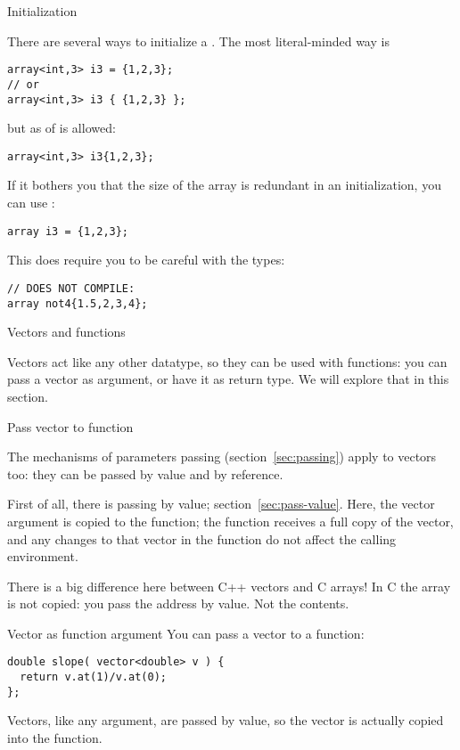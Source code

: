  {Initialization}

There are several ways to initialize a .
The most literal-minded way is
\begin{lstlisting}
array<int,3> i3 = {1,2,3};
// or
array<int,3> i3 { {1,2,3} };
\end{lstlisting}
but as of   is allowed:
\begin{lstlisting}
array<int,3> i3{1,2,3};  
\end{lstlisting}
If it bothers you that the size of the array is redundant in an initialization,
you can use  :
\begin{lstlisting}
array i3 = {1,2,3};  
\end{lstlisting}
This does require you to be careful with the types:
\begin{lstlisting}
// DOES NOT COMPILE:
array not4{1.5,2,3,4};
\end{lstlisting}

 {Vectors and functions}

Vectors act like any other datatype, so they can be used with functions:
you can pass a vector as argument, or have it as return type.
We will explore that in this section.

 {Pass vector to function}

The mechanisms of parameters passing (section~\ref{sec:passing})
apply to vectors too: they can be passed by value and by reference.

First of all, there is passing by value; section~\ref{sec:pass-value}.
Here, the vector argument is copied to the function;
the function receives a full copy of the vector,
and any changes to that vector in the function
do not affect the calling environment.

\begin{cnote}
  There is a big difference here between C++ vectors and C arrays!
  In C the array is not copied: you pass the address by value. Not the contents.
\end{cnote}

\begin{slide}{Vector as function argument}
  \label{sl:vector-arg}
  You can pass a vector to a function:
\begin{lstlisting}
double slope( vector<double> v ) {
  return v.at(1)/v.at(0);
};
\end{lstlisting}
Vectors, like any argument, are passed by value, so the vector is
actually copied into the function.
\end{slide}

